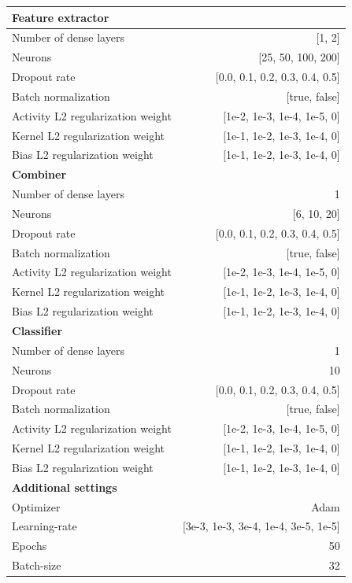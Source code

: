 \documentclass[preprint]{elsarticle}
\begin{document}
\renewcommand{\arraystretch}{1.2}
\begin{table}[H]
  \centering
  \scriptsize
\begin{adjustbox}{center}
\begin{tabular}{@{}lr@{}}
\toprule
\textbf{Feature extractor}  & \\
\midrule
{Number of dense layers}    & [1, 2] \\
{Neurons}                   & [25, 50, 100, 200] \\
{Dropout rate}                  & [0.0, 0.1, 0.2, 0.3, 0.4, 0.5] \\
{Batch normalization}       & [true, false] \\
{Activity L2 regularization weight}   & [1e-2, 1e-3, 1e-4, 1e-5, 0] \\
{Kernel L2 regularization weight}     & [1e-1, 1e-2, 1e-3, 1e-4, 0] \\
{Bias L2 regularization weight}       & [1e-1, 1e-2, 1e-3, 1e-4, 0] \\
\midrule
\textbf{Combiner}           & \\
\midrule
{Number of dense layers}    & 1 \\
{Neurons}                   & [6, 10, 20] \\
{Dropout rate}                  & [0.0, 0.1, 0.2, 0.3, 0.4, 0.5] \\
{Batch normalization}       & [true, false] \\
{Activity L2 regularization weight}   & [1e-2, 1e-3, 1e-4, 1e-5, 0] \\
{Kernel L2 regularization weight}     & [1e-1, 1e-2, 1e-3, 1e-4, 0] \\
{Bias L2 regularization weight}       & [1e-1, 1e-2, 1e-3, 1e-4, 0] \\
\midrule
\textbf{Classifier}         & \\
\midrule
{Number of dense layers}    & 1 \\
{Neurons}                   & 10 \\
{Dropout rate}                  & [0.0, 0.1, 0.2, 0.3, 0.4, 0.5] \\
{Batch normalization}       & [true, false] \\
{Activity L2 regularization weight}   & [1e-2, 1e-3, 1e-4, 1e-5, 0] \\
{Kernel L2 regularization weight}     & [1e-1, 1e-2, 1e-3, 1e-4, 0] \\
{Bias L2 regularization weight}       & [1e-1, 1e-2, 1e-3, 1e-4, 0] \\
\midrule
\textbf{Additional settings} & \\
\midrule
Optimizer                   & Adam \\
Learning-rate               & [3e-3, 1e-3, 3e-4, 1e-4, 3e-5, 1e-5] \\
Epochs                      & 50 \\
Batch-size                  & 32 \\


\end{tabular}
\end{adjustbox}
\end{table}
\end{document}
